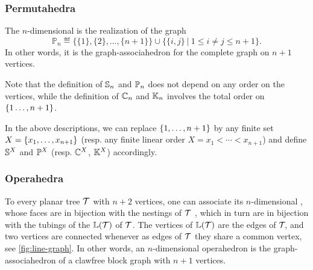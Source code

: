 \subsubsection{Permutahedra}
The $n$-dimensional  is the realization of the graph 
$$\mathbb{P}_n\eqdef  \{\{1\},\{2\},\ldots,\{n+1\}\} \cup \{\{i,j\} \ | \ 1 \leq i \neq j \leq n+1 \}.$$
In other words, it is the graph-associahedron for the complete graph on $n+1$ vertices.

Note that the definition of ${\mathbb S}_n$ and ${\mathbb P}_n$ does not depend on any order on the vertices, while the definition of ${\mathbb C}_n$ and ${\mathbb K}_n$ involves the total order on~$\left\{1\ldots,n+1\right\}$. 

\begin{rem}
  In the above descriptions, we can replace $\left\{1,\ldots,n+1\right\}$ by any finite set $X=\left\{x_1,\ldots,x_{n+1}\right\}$  (resp. any finite linear order $X=x_1<\cdots<x_{n+1}$)  and define ${\mathbb S}^X$ and ${\mathbb P}^X$ (resp. ${\mathbb C}^X$, ${\mathbb K}^X$) accordingly.
\end{rem}


\subsubsection{Operahedra}
To every  planar tree $\mathcal{T}$ with $n+2$ vertices, one can associate its $n$-dimensional , whose faces are in bijection with the nestings of $\mathcal{T}$ \cite{laplante-anfossiDiagonalOperahedra2022a,CLA1}, which in turn
are in bijection with the tubings of the  $\mathbb{L}(\mathcal{T})$ of $\mathcal{T}$.
The vertices of $\mathbb{L}(\mathcal{T})$ are the edges of ${\cal T}\!$, and two vertices are connected whenever as edges of ${\cal T}$ they share a common vertex, see \cref{fig:line-graph}.
In other words, an $n$-dimensional operahedron is the graph-associahedron of a clawfree block graph with $n+1$ vertices.

